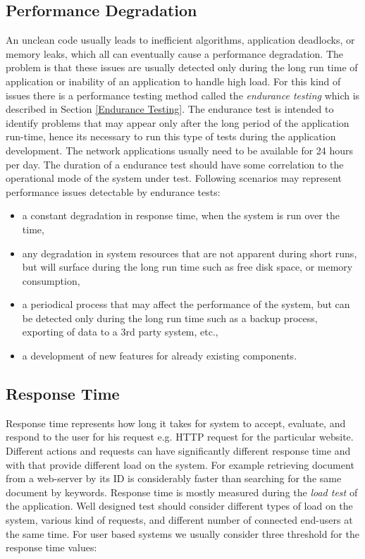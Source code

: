 \subsection*{Performance Degradation}
\label{Performance Degradation}
An unclean code usually leads to inefficient algorithms, application deadlocks, or memory leaks, which all can eventually cause a performance degradation. The problem is that these issues are usually detected only during the long run time of application or inability of an application to handle high load. For this kind of issues there is a performance testing method called the \emph{endurance testing} \cite{BUCH:4TYPES, Manzor:APTB} which is described in Section \ref{Endurance Testing}. The endurance test is intended to identify problems that may appear only after the long period of the application run-time\footnotemark{}, hence its necessary to run this type of tests during the application development. The network applications usually need to be available for 24 hours per day. The duration of a endurance test should have some correlation to the operational mode of the system under test. Following scenarios may represent performance issues detectable by endurance tests:

\begin{itemize}
	\setlength\itemsep{0em}
	\item a constant degradation in response time, when the system is run over the time,
	\item any degradation in system resources that are not apparent during short runs, but will surface during the long run time such as free disk space, or memory consumption,
	\item a periodical process that may affect the performance of the system, but can be detected only during the long run time such as a backup process, exporting of data to a 3rd party system, etc.,
	\item a development of new features for already existing components.
\end{itemize}


\subsection*{Response Time}
\label{Response Time 1}
Response time represents how long it takes for system to accept, evaluate, and respond to the user for his request e.g. HTTP request for the particular website. Different actions and requests can have significantly different response time and with that provide different load on the system. For example retrieving document from a web-server by its ID is considerably faster than searching for the same document by keywords. Response time is mostly measured during the \emph{load test} \cite{Manzor:APTB} of the application. Well designed test should consider different types of load on the system, various kind of requests, and different number of connected end-users at the same time. For user based systems we usually consider three threshold for the response time values:

